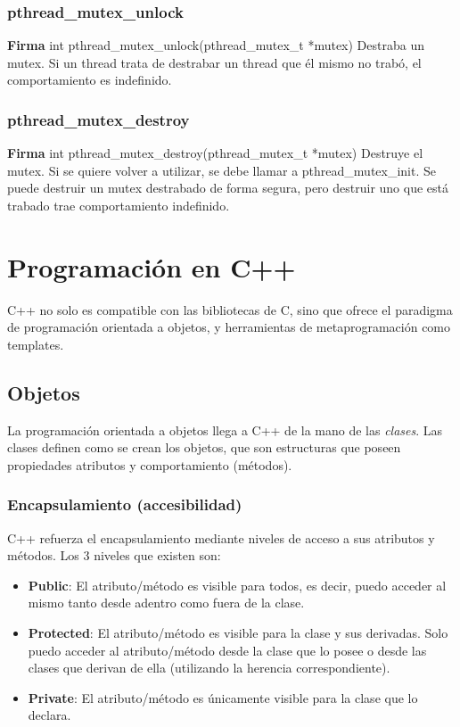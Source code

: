 \documentclass[oneside]{article}
\begin{document}
			\subsubsection{pthread\_mutex\_unlock}
			\textbf{Firma} int pthread\_mutex\_unlock(pthread\_mutex\_t *mutex)
			Destraba un mutex. Si un thread trata de destrabar un thread que él mismo no trabó, el comportamiento es indefinido.

			\subsubsection{pthread\_mutex\_destroy}
			\textbf{Firma} int pthread\_mutex\_destroy(pthread\_mutex\_t *mutex)
			Destruye el mutex. Si se quiere volver a utilizar, se debe llamar a pthread\_mutex\_init. Se puede destruir un mutex destrabado de forma segura, pero destruir uno que está trabado trae comportamiento indefinido.

\pagebreak

\section{Programación en C++}
	C++ no solo es compatible con las bibliotecas de C, sino que ofrece el paradigma de programación orientada a objetos, y herramientas de metaprogramación como templates.
	\subsection{Objetos}
	La programación orientada a objetos llega a C++ de la mano de las \emph{clases}. Las clases definen como se crean los objetos, que son estructuras que poseen propiedades atributos y comportamiento (métodos).
		\subsubsection{Encapsulamiento (accesibilidad)}
		C++ refuerza el encapsulamiento mediante niveles de acceso a sus atributos y métodos. Los 3 niveles que existen son:
		\begin{itemize}
			\item \textbf{Public}: El atributo/método es visible para todos, es decir, puedo acceder al mismo tanto desde adentro como fuera de la clase.
			\item \textbf{Protected}: El atributo/método es visible para la clase y sus derivadas. Solo puedo acceder al atributo/método desde la clase que lo posee o desde las clases que derivan de ella (utilizando la herencia correspondiente).
			\item \textbf{Private}: El atributo/método es únicamente visible para la clase que lo declara.
			
			
		\end{itemize}
\end{document}
